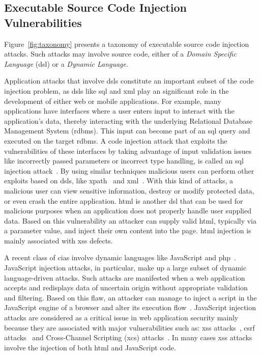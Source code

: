 \documentclass[conference]{IEEEtran}
\begin{document}
\subsection{Executable Source Code Injection Vulnerabilities}

Figure~\ref{fig:taxonomy} presents a taxonomy of executable source
code injection attacks. Such attacks may involve source code, either of a
{\it Domain Specific Language} ({\sc dsl}) or a {\it Dynamic Language}.

Application attacks that involve {\sc dsl}s constitute an important
subset of the code injection problem, as {\sc dsl}s like {\sc sql} and
{\sc xml} play an significant role in the development of either web or
mobile applications. For example, many applications have interfaces
where a user enters input to interact with the application's data,
thereby interacting with the underlying Relational Database Management
System ({\sc rdbms}). This input can become part of an {\sc sql} query
and executed on the target {\sc rdbms}. A code injection attack that
exploits the vulnerabilities of these interfaces by taking advantage
of input validation issues like incorrectly passed parameters or
incorrect type handling, is called an {\sc sql} injection
attack~\cite{CERT02,MS09,HVO06,SW06}. By using similar techniques
malicious users can perform other exploits based on {\sc dsl}s, like
{\sc xp}ath~\cite{SW06,CDL07,MKS09} and {\sc xml}~\cite{MSM13}. With
this kind of attacks, a malicious user can view sensitive information,
destroy or modify protected data, or even crash the entire
application. {\sc html} is another {\sc dsl} that can be used
for malicious purposes when an application does not properly
handle user supplied data. Based on this vulnerability
an attacker can supply valid {\sc html},
typically via a parameter value, and inject their own
content into the page. {\sc html} injection is mainly associated
with {\sc xss} defects.

A recent class of {\sc cia}s involve dynamic languages like
JavaScript and {\sc php}~\cite{SFVM09,EWKK09,SMS13}. JavaScript
injection attacks, in particular, make up a large subset of dynamic
language-driven attacks. Such attacks are manifested when a web
application accepts and redisplays data of uncertain origin without
appropriate validation and filtering. Based on this flaw, an attacker
can manage to inject a script in the JavaScript engine of a browser
and alter its execution flow~\cite{ELX07}. JavaScript injection
attacks are considered as a critical issue in web application security
mainly because they are associated with major vulnerabilities such as:
{\sc xss} attacks~\cite{SG07}, {\sc csrf} attacks~\cite{LZRL09} and
Cross-Channel Scripting ({\sc xcs}) attacks~\cite{W10,BBB09}.
In many cases {\sc xss} attacks involve the injection of
both {\sc html} and JavaScript code.
\end{document}
